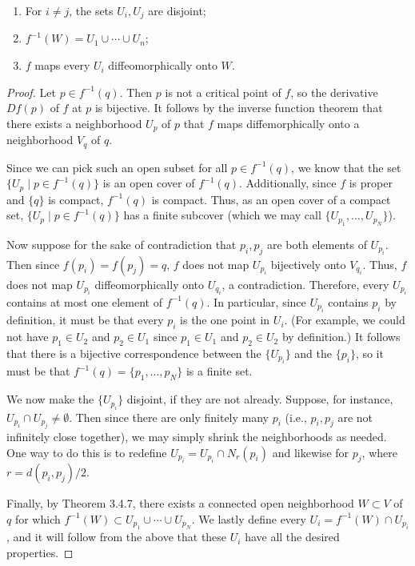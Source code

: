 \documentclass[../notes.tex]{subfiles}
\begin{document}
\begin{itemize}
\begin{enumerate}
        \item For $i\neq j$, the sets $U_i,U_j$ are disjoint;
        \item $f^{-1}(W)=U_1\cup\cdots\cup U_n$;
        \item $f$ maps every $U_i$ diffeomorphically onto $W$.
    \end{enumerate}
    \begin{proof}
        Let $p\in f^{-1}(q)$. Then $p$ is not a critical point of $f$, so the derivative $Df(p)$ of $f$ at $p$ is bijective. It follows by the inverse function theorem that there exists a neighborhood $U_p$ of $p$ that $f$ maps diffemorphically onto a neighborhood $V_q$ of $q$.\par
        Since we can pick such an open subset for all $p\in f^{-1}(q)$, we know that the set $\{U_p\mid p\in f^{-1}(q)\}$ is an open cover of $f^{-1}(q)$. Additionally, since $f$ is proper and $\{q\}$ is compact, $f^{-1}(q)$ is compact. Thus, as an open cover of a compact set, $\{U_p\mid p\in f^{-1}(q)\}$ has a finite subcover (which we may call $\{U_{p_1},\dots,U_{p_N}\}$).\par
        Now suppose for the sake of contradiction that $p_i,p_j$ are both elements of $U_{p_i}$. Then since $f(p_i)=f(p_j)=q$, $f$ does not map $U_{p_i}$ bijectively onto $V_{q_i}$. Thus, $f$ does not map $U_{p_i}$ diffeomorphically onto $U_{q_i}$, a contradiction. Therefore, every $U_{p_i}$ contains at most one element of $f^{-1}(q)$. In particular, since $U_{p_i}$ contains $p_i$ by definition, it must be that every $p_i$ is the one point in $U_i$. (For example, we could not have $p_1\in U_2$ and $p_2\in U_1$ since $p_1\in U_1$ and $p_2\in U_2$ by definition.) It follows that there is a bijective correspondence between the $\{U_{p_i}\}$ and the $\{p_i\}$, so it must be that $f^{-1}(q)=\{p_1,\dots,p_N\}$ is a finite set.\par
        We now make the $\{U_{p_i}\}$ disjoint, if they are not already. Suppose, for instance, $U_{p_i}\cap U_{p_j}\neq\emptyset$. Then since there are only finitely many $p_i$ (i.e., $p_i,p_j$ are not infinitely close together), we may simply shrink the neighborhoods as needed. One way to do this is to redefine $U_{p_i}=U_{p_i}\cap N_r(p_i)$ and likewise for $p_j$, where $r=d(p_i,p_j)/2$.\par
        Finally, by Theorem 3.4.7, there exists a connected open neighborhood $W\subset V$ of $q$ for which $f^{-1}(W)\subset U_{p_1}\cup\cdots\cup U_{p_N}$. We lastly define every $U_i=f^{-1}(W)\cap U_{p_i}$, and it will follow from the above that these $U_i$ have all the desired properties.

\end{proof}
\end{itemize}
\end{document}
